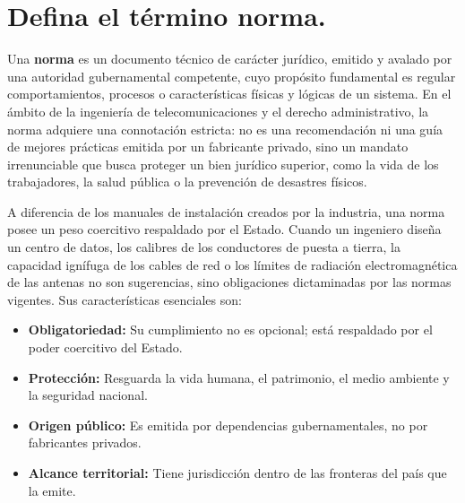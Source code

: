 \documentclass[a4paper,12pt]{article}
\begin{document}
\renewcommand{\footrulewidth}{0.4pt}  %

\setcounter{page}{1}

\tableofcontents

\newpage

\section{Defina el término norma.}

Una \textbf{norma} es un documento técnico de carácter jurídico, emitido y avalado por una autoridad gubernamental competente, cuyo propósito fundamental es regular comportamientos, procesos o características físicas y lógicas de un sistema. En el ámbito de la ingeniería de telecomunicaciones y el derecho administrativo, la norma adquiere una connotación estricta: no es una recomendación ni una guía de mejores prácticas emitida por un fabricante privado, sino un mandato irrenunciable que busca proteger un bien jurídico superior, como la vida de los trabajadores, la salud pública o la prevención de desastres físicos.

A diferencia de los manuales de instalación creados por la industria, una norma posee un peso coercitivo respaldado por el Estado. Cuando un ingeniero diseña un centro de datos, los calibres de los conductores de puesta a tierra, la capacidad ignífuga de los cables de red o los límites de radiación electromagnética de las antenas no son sugerencias, sino obligaciones dictaminadas por las normas vigentes. Sus características esenciales son:

\begin{itemize}
    \item \textbf{Obligatoriedad:} Su cumplimiento no es opcional; está respaldado por el poder coercitivo del Estado.
    \item \textbf{Protección:} Resguarda la vida humana, el patrimonio, el medio ambiente y la seguridad nacional.
    \item \textbf{Origen público:} Es emitida por dependencias gubernamentales, no por fabricantes privados.
    \item \textbf{Alcance territorial:} Tiene jurisdicción dentro de las fronteras del país que la emite.
\end{itemize}
\end{document}
